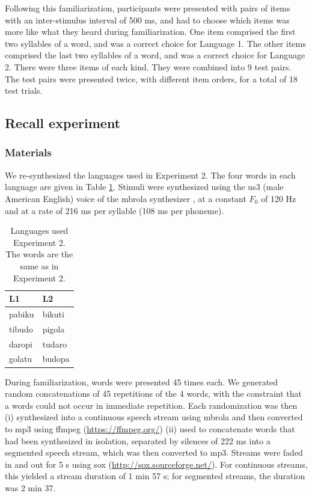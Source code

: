 \documentclass[
]{article}
\begin{document}
Following this familiarization, participants were presented with pairs
of items with an inter-stimulus interval of 500 ms, and had to choose
which items was more like what they heard during familiarization. One
item comprised the first two syllables of a word, and was a correct
choice for Language 1. The other items comprised the last two syllables
of a word, and was a correct choice for Language 2. There were three
items of each kind. They were combined into 9 test pairs. The test pairs
were presented twice, with different item orders, for a total of 18 test
trials.

\hypertarget{recall-experiment}{%
\subsection{Recall experiment}\label{recall-experiment}}

\hypertarget{materials}{%
\subsubsection{Materials}\label{materials}}

We re-synthesized the languages used in \citet{Saffran-Science}
Experiment 2. The four words in each language are given in Table
\ref{tab:recall-languages}. Stimuli were synthesized using the us3 (male
American English) voice of the mbrola synthesizer \citep{mbrola}, at a
constant \(F_0\) of 120 Hz and at a rate of 216 ms per syllable (108 ms
per phoneme).

\begin{table}

\caption{\label{tab:recall-print-languages}\label{tab:recall-languages}Languages used Experiment 2. The words are the same as in \cite{Saffran-Science} Experiment 2.}
\centering
\begin{tabular}[t]{ll}
\toprule
L1 & L2\\
\midrule
pabiku & bikuti\\
tibudo & pigola\\
daropi & tudaro\\
golatu & budopa\\
\bottomrule
\end{tabular}
\end{table}

During familiarization, words were presented 45 times each. We generated
random concatenations of 45 repetitions of the 4 words, with the
constraint that a words could not occur in immediate repetition. Each
randomization was then (i) synthesized into a continuous speech stream
using mbrola and then converted to mp3 using ffmpeg
(\url{https://ffmpeg.org/}) (ii) used to concatenate words that had been
synthesized in isolation, separated by silences of 222 ms into a
segmented speech stream, which was then converted to mp3. Streams were
faded in and out for 5 s using sox (\url{http://sox.sourceforge.net/}).
For continuous streams, this yielded a stream duration of 1 min 57 s;
for segmented streams, the duration was 2 min 37.
\end{document}
